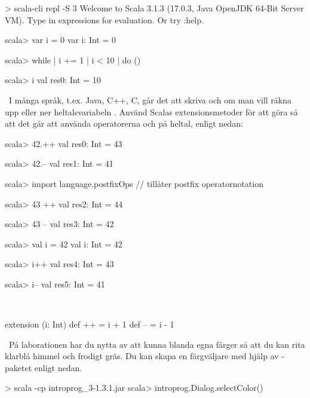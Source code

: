 \SubtaskSolved 
\begin{REPLnonum}
> scala-cli repl -S 3
Welcome to Scala 3.1.3 (17.0.3, Java OpenJDK 64-Bit Server VM).
Type in expressions for evaluation. Or try :help.

scala> var i = 0
var i: Int = 0

scala> while
     |   i += 1
     |   i < 10
     | do ()

scala> i
val res0: Int = 10
\end{REPLnonum}



\QUESTEND



\QUESTBEGIN

\Task \what~I många språk, t.ex. Java, C++, C, går det att skriva  och  om man vill räkna upp eller ner heltalsvariabeln . Använd Scalas extensionsmetoder för att göra så att det går att använda operatorerna \code{++} och \code{--} på heltal, enligt nedan:
\begin{REPLnonum}
scala> 42.++
val res0: Int = 43

scala> 42.--
val res1: Int = 41

scala> import language.postfixOps    // tillåter postfix operatornotation

scala> 43 ++
val res2: Int = 44

scala> 43 --
val res3: Int = 42

scala> val i = 42
val i: Int = 42

scala> i++
val res4: Int = 43

scala> i--
val res5: Int = 41
\end{REPLnonum}

\SOLUTION

\TaskSolved \what~

\begin{Code}
extension (i: Int)
  def ++ = i + 1
  def -- = i - 1
\end{Code}


\QUESTEND





\QUESTBEGIN

\Task \what~På laborationen har du nytta av att kunna blanda egna färger så att du kan rita klarblå himmel och frodigt gräs. Du kan skapa en färgväljare med hjälp av -paketet enligt nedan.
\begin{REPL}
> scala -cp introprog_3-1.3.1.jar
scala> introprog.Dialog.selectColor()
\end{REPL}

